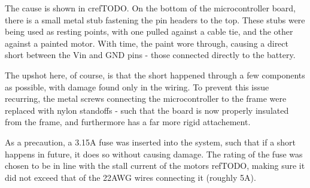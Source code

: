 \documentclass[main.tex]{subfiles}
\begin{document}
The cause is shown in cref{TODO}. On the bottom of the microcontroller board, there is a small metal stub fastening the pin headers to the top. These stubs were being used as resting points, with one pulled against a cable tie, and the other against a painted motor. With time, the paint wore through, causing a direct short between the Vin and GND pins - those connected directly to the battery.

The upshot here, of course, is that the short happened through a few components as possible, with damage found only in the wiring. To prevent this issue recurring, the metal screws connecting the microcontroller to the frame were replaced with nylon standoffs - such that the board is now properly insulated from the frame, and furthermore has a far more rigid attachement.

As a precaution, a 3.15A fuse was inserted into the system, such that if a short happens in future, it does so without causing damage. The rating of the fuse was chosen to be in line with the stall current of the motors ref{TODO}, making sure it did not exceed that of the 22AWG wires connecting it (roughly 5A).




\bib
\end{document}
